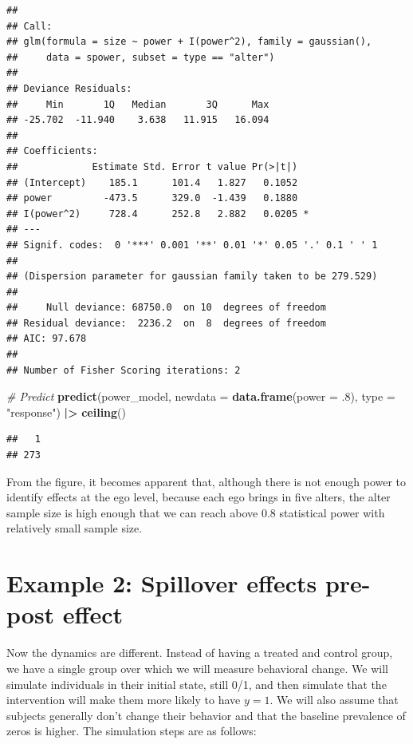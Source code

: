 \documentclass[]{book}
\newenvironment{Shaded}{\begin{snugshade}}{\end{snugshade}}
\newcommand{\CommentTok}[1]{\textcolor[rgb]{0.56,0.35,0.01}{\textit{#1}}}
\newcommand{\DataTypeTok}[1]{\textcolor[rgb]{0.13,0.29,0.53}{#1}}
\newcommand{\ErrorTok}[1]{\textcolor[rgb]{0.64,0.00,0.00}{\textbf{#1}}}
\newcommand{\FloatTok}[1]{\textcolor[rgb]{0.00,0.00,0.81}{#1}}
\newcommand{\KeywordTok}[1]{\textcolor[rgb]{0.13,0.29,0.53}{\textbf{#1}}}
\newcommand{\NormalTok}[1]{#1}
\newcommand{\OperatorTok}[1]{\textcolor[rgb]{0.81,0.36,0.00}{\textbf{#1}}}
\newcommand{\StringTok}[1]{\textcolor[rgb]{0.31,0.60,0.02}{#1}}
\begin{document}
\begin{verbatim}
## 
## Call:
## glm(formula = size ~ power + I(power^2), family = gaussian(), 
##     data = spower, subset = type == "alter")
## 
## Deviance Residuals: 
##     Min       1Q   Median       3Q      Max  
## -25.702  -11.940    3.638   11.915   16.094  
## 
## Coefficients:
##             Estimate Std. Error t value Pr(>|t|)  
## (Intercept)    185.1      101.4   1.827   0.1052  
## power         -473.5      329.0  -1.439   0.1880  
## I(power^2)     728.4      252.8   2.882   0.0205 *
## ---
## Signif. codes:  0 '***' 0.001 '**' 0.01 '*' 0.05 '.' 0.1 ' ' 1
## 
## (Dispersion parameter for gaussian family taken to be 279.529)
## 
##     Null deviance: 68750.0  on 10  degrees of freedom
## Residual deviance:  2236.2  on  8  degrees of freedom
## AIC: 97.678
## 
## Number of Fisher Scoring iterations: 2
\end{verbatim}

\begin{Shaded}
\begin{Highlighting}[]
\CommentTok{# Predict}
\KeywordTok{predict}\NormalTok{(power_model, }\DataTypeTok{newdata =} \KeywordTok{data.frame}\NormalTok{(}\DataTypeTok{power =} \FloatTok{.8}\NormalTok{), }\DataTypeTok{type =} \StringTok{"response"}\NormalTok{) }\OperatorTok{|}\ErrorTok{>}
\StringTok{  }\KeywordTok{ceiling}\NormalTok{()}
\end{Highlighting}
\end{Shaded}

\begin{verbatim}
##   1 
## 273
\end{verbatim}

From the figure, it becomes apparent that, although there is not enough power to identify effects at the ego level, because each ego brings in five alters, the alter sample size is high enough that we can reach above 0.8 statistical power with relatively small sample size.

\hypertarget{example-2-spillover-effects-pre-post-effect}{%
\section{Example 2: Spillover effects pre-post effect}\label{example-2-spillover-effects-pre-post-effect}}

Now the dynamics are different. Instead of having a treated and control group, we have a single group over which we will measure behavioral change. We will simulate individuals in their initial state, still 0/1, and then simulate that the intervention will make them more likely to have \(y = 1.\) We will also assume that subjects generally don't change their behavior and that the baseline prevalence of zeros is higher. The simulation steps are as follows:
\end{document}

